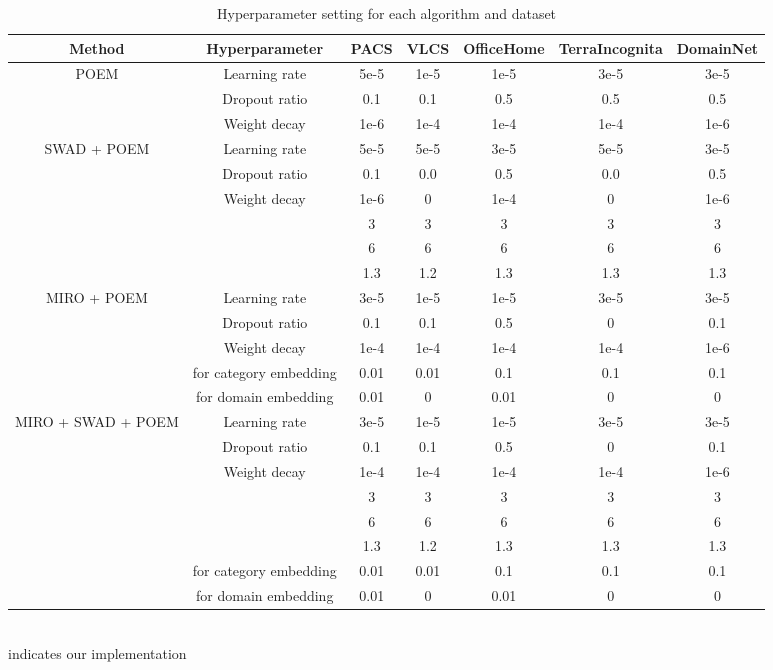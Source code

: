 \documentclass[letterpaper]{article} \usepackage{aaai23}  \usepackage{times}  \usepackage{helvet}  \usepackage{courier}  \usepackage[hyphens]{url}  \usepackage{graphicx} \urlstyle{rm} \def\UrlFont{\rm}  \usepackage{natbib}  \usepackage{caption} \frenchspacing  \setlength{\pdfpagewidth}{8.5in}  \setlength{\pdfpageheight}{11in}  \usepackage[labelsep=period]{caption}
\begin{document}
\begin{table}[H]
\centering
	\begin{tabular}{c|c|ccccc}
		\toprule
		\textbf{Method} & \textbf{Hyperparameter} & PACS & VLCS & OfficeHome & TerraIncognita & DomainNet \\
		\midrule
		POEM & Learning rate & 5e-5 & 1e-5 & 1e-5 & 3e-5 & 3e-5\\
		 & Dropout ratio & 0.1 & 0.1 & 0.5 & 0.5 & 0.5\\		
		 & Weight decay & 1e-6 & 1e-4 & 1e-4 & 1e-4 & 1e-6\\
		\midrule
		SWAD + POEM & Learning rate & 5e-5 & 5e-5 & 3e-5 & 5e-5 & 3e-5\\
		 & Dropout ratio & 0.1 & 0.0 & 0.5 & 0.0 & 0.5\\		
		& Weight decay & 1e-6 & 0 & 1e-4 & 0 & 1e-6\\
		&  & 3 & 3 & 3 & 3 & 3\\
		&  & 6 & 6 & 6 & 6 & 6\\
		&  & 1.3 & 1.2 & 1.3 & 1.3 & 1.3\\		
		\midrule
		MIRO + POEM & Learning rate & 3e-5 & 1e-5 & 1e-5 & 3e-5 & 3e-5\\
		& Dropout ratio & 0.1 & 0.1 & 0.5 & 0 & 0.1\\		
		& Weight decay & 1e-4 & 1e-4 & 1e-4 & 1e-4 & 1e-6\\
		&  for category embedding & 0.01 & 0.01 & 0.1 & 0.1 & 0.1\\
		&  for domain embedding & 0.01 & 0 & 0.01 & 0 & 0\\	
		\midrule
		MIRO + SWAD + POEM & Learning rate & 3e-5 & 1e-5 & 1e-5 & 3e-5 & 3e-5\\
		& Dropout ratio & 0.1 & 0.1 & 0.5 & 0 & 0.1\\		
		& Weight decay & 1e-4 & 1e-4 & 1e-4 & 1e-4 & 1e-6\\
		&  & 3 & 3 & 3 & 3 & 3\\
		&  & 6 & 6 & 6 & 6 & 6\\
		&  & 1.3 & 1.2 & 1.3 & 1.3 & 1.3\\
		&  for category embedding & 0.01 & 0.01 & 0.1 & 0.1 & 0.1\\
		&  for domain embedding & 0.01 & 0 & 0.01 & 0 & 0\\	
		\bottomrule
	\end{tabular}
        \footnotesize{\\ indicates our implementation}\\
        \caption{Hyperparameter setting for each algorithm and dataset}
	\label{tab:HP}
\end{table}	
\end{document}
